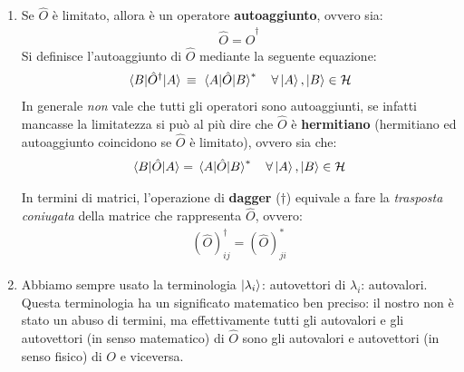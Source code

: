 \begin{enumerate}[label=\arabic*)]
	
	\item Se $\hat{O}$ è limitato, allora è un operatore \textbf{autoaggiunto}, ovvero sia:
	\begin{align*}
		\hat{O} = \hat{O}^{\dagger}
	\end{align*}
		Si definisce l'autoaggiunto di $\hat{O}$ mediante la seguente equazione:
	\begin{align*}
		\mel{B}{\hat{O}^{\dagger}}{A} \, \equiv \,  \mel{A}{\hat{O}}{B}^* \quad \forall \ket{A}, \ket{B} \in \mathcal{H}
	\end{align*}
		In generale \textit{non} vale che tutti gli operatori sono autoaggiunti, se infatti mancasse la limitatezza si può al più dire che $\hat{O}$ è \textbf{hermitiano} (hermitiano ed autoaggiunto coincidono se $\hat{O}$ è limitato), ovvero sia che:
	\begin{align*}
		\mel{B}{\hat{O}}{A} = \mel{A}{\hat{O}}{B}^* \quad \forall \ket{A}, \ket{B} \in \mathcal{H}
	\end{align*}
	
	\begin{myapprf}
		In termini di matrici, l'operazione di \textbf{dagger} ($\dagger$) equivale a fare la \textit{trasposta coniugata} della matrice che rappresenta $\hat{O}$, ovvero:
	\begin{align*}
		(\hat{O})_{ij}^{\dagger} = (\hat{O})_{ji}^*
	\end{align*}
	\end{myapprf}
	
	\item Abbiamo sempre usato la terminologia $\ket{\lambda_i}$: autovettori di $\lambda_i$: autovalori. Questa terminologia ha un significato matematico ben preciso: il nostro non è stato un abuso di termini, ma effettivamente tutti gli autovalori e gli autovettori (in senso matematico) di $\hat{O}$ sono gli autovalori e autovettori (in senso fisico) di $O$ e viceversa.
	

\end{enumerate}
